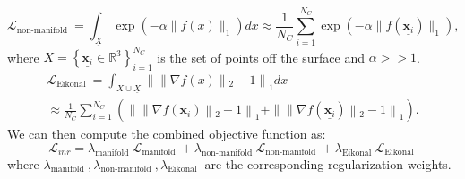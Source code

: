 \begin{equation}\label{non_manifold_sdf}
    \mathcal{L}_{\text {non-manifold }}=\int_{\underline{X}} \exp \left(-\alpha\|f(x)\|_{1}\right) d x \approx \frac{1}{N_C}\sum_{i=1}^{N_C} \exp \left(-\alpha\|f(\underline{\mathbf{x}_i})\|_1\right),
\end{equation}
where $\underline{X}=\left\{\underline{\mathbf{x}_i} \in \mathbb{R}^{3}\right\}_{i=1}^{N_C}$ is the set of points off the surface and $\alpha>>1$.
\begin{equation}\label{Eikonal}
     \begin{aligned}
         \mathcal{L}_{\text {Eikonal }}=\int_{X \cup \underline{X}} \| \| \nabla f(x)\left\|_{2}-1\right\|_{1} d x \\
         \approx \frac{1}{N_C}\sum_{i=1}^{N_C} \left(\| \| \nabla f(\mathbf{x}_i)\left\|_{2}-1\right\|_{1} + \| \| \nabla f(\underline{\mathbf{x}_i})\left\|_{2}-1\right\|_{1} \right).
     \end{aligned}
\end{equation}
We can then compute the combined objective function as:
\begin{equation}\label{inr_loss1}
    \mathcal{L}_{inr}= \lambda_{\text {manifold }} \mathcal{L}_{\text {manifold }}+\lambda_{\text {non-manifold }} \mathcal{L}_{\text {non-manifold }}+ \lambda_{\text {Eikonal }} \mathcal{L}_{\text {Eikonal }}
\end{equation}
where $\lambda_{\text {manifold }}, \lambda_{\text {non-manifold }}, \lambda_{\text {Eikonal }}$ are the corresponding regularization weights.
\newline


